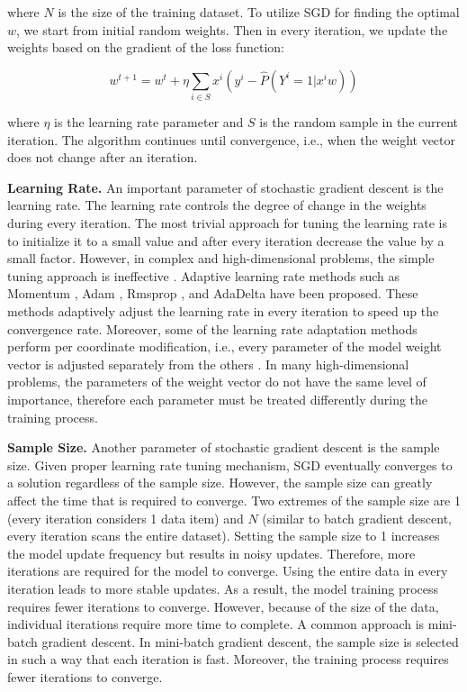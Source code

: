 where $N$ is the size of the training dataset.
To utilize SGD for finding the optimal $w$, we start from initial random weights.
Then in every iteration, we update the weights based on the gradient of the loss function:

\begin{equation}
{w}^{t+1} = {w}^t + \eta \sum_{i \in S} x^i (y^i - \hat{P}(Y^i = 1 | x^i w))
\end{equation}

where $\eta$ is the learning rate parameter and $S$ is the random sample in the current iteration.
The algorithm continues until convergence, i.e., when the weight vector does not change after an iteration.

\textbf{Learning Rate.}
An important parameter of stochastic gradient descent is the learning rate.
The learning rate controls the degree of change in the weights during every iteration.
The most trivial approach for tuning the learning rate is to initialize it to a small value and after every iteration decrease the value by a small factor.
However, in complex and high-dimensional problems, the simple tuning approach is ineffective \cite{schaul2013no}. 
Adaptive learning rate methods such as Momentum \cite{qian1999momentum}, Adam \cite{kingma2014adam}, Rmsprop \cite{tieleman2012lecture}, and AdaDelta \cite{zeiler2012adadelta} have been proposed.
These methods adaptively adjust the learning rate in every iteration to speed up the convergence rate.
Moreover, some of the learning rate adaptation methods perform per coordinate modification, i.e., every parameter of the model weight vector is adjusted separately from the others \cite{kingma2014adam, tieleman2012lecture, zeiler2012adadelta}. 
In many high-dimensional problems, the parameters of the weight vector do not have the same level of importance, therefore each parameter must be treated differently during the training process.

\textbf{Sample Size.}
Another parameter of stochastic gradient descent is the sample size.
Given proper learning rate tuning mechanism, SGD eventually converges to a solution regardless of the sample size.
However, the sample size can greatly affect the time that is required to converge.
Two extremes of the sample size are 1 (every iteration considers 1 data item) and $N$ (similar to batch gradient descent, every iteration scans the entire dataset).
Setting the sample size to 1 increases the model update frequency but results in noisy updates.
Therefore, more iterations are required for the model to converge.
Using the entire data in every iteration leads to more stable updates.
As a result, the model training process requires fewer iterations to converge.
However, because of the size of the data, individual iterations require more time to complete.
A common approach is mini-batch gradient descent.
In mini-batch gradient descent, the sample size is selected in such a way that each iteration is fast.
Moreover, the training process requires fewer iterations to converge.


